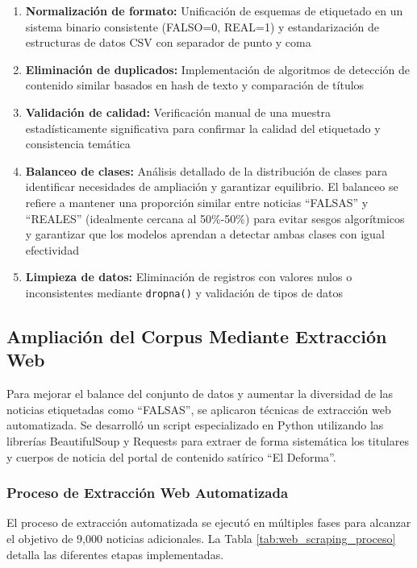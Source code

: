 \begin{enumerate}
    \item \textbf{Normalización de formato:} Unificación de esquemas de etiquetado en un sistema binario consistente (FALSO=0, REAL=1) y estandarización de estructuras de datos CSV con separador de punto y coma
    \item \textbf{Eliminación de duplicados:} Implementación de algoritmos de detección de contenido similar basados en hash de texto y comparación de títulos
    \item \textbf{Validación de calidad:} Verificación manual de una muestra estadísticamente significativa para confirmar la calidad del etiquetado y consistencia temática
    \item \textbf{Balanceo de clases:} Análisis detallado de la distribución de clases para identificar necesidades de ampliación y garantizar equilibrio. El balanceo se refiere a mantener una proporción similar entre noticias ``FALSAS'' y ``REALES'' (idealmente cercana al 50\%-50\%) para evitar sesgos algorítmicos y garantizar que los modelos aprendan a detectar ambas clases con igual efectividad
    \item \textbf{Limpieza de datos:} Eliminación de registros con valores nulos o inconsistentes mediante \texttt{dropna()} y validación de tipos de datos
\end{enumerate}

\subsection{Ampliación del Corpus Mediante Extracción Web}

Para mejorar el balance del conjunto de datos y aumentar la diversidad de las noticias etiquetadas como ``FALSAS'', se aplicaron técnicas de extracción web automatizada. Se desarrolló un script especializado en Python utilizando las librerías BeautifulSoup y Requests para extraer de forma sistemática los titulares y cuerpos de noticia del portal de contenido satírico ``El Deforma''.

\subsubsection{Proceso de Extracción Web Automatizada}

El proceso de extracción automatizada se ejecutó en múltiples fases para alcanzar el objetivo de 9,000 noticias adicionales. La Tabla \ref{tab:web_scraping_proceso} detalla las diferentes etapas implementadas.

